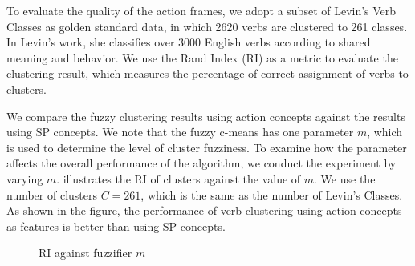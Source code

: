 
To evaluate the quality of the action frames,
we adopt a subset of Levin's Verb Classes as golden standard data,
in which 2620 verbs are clustered to 261 classes. In Levin's work\cite{1415692}, she classifies
over 3000 English verbs according to shared meaning and behavior.
We use the Rand Index (RI)\cite{1961008} as a metric to evaluate
the clustering result, which measures the percentage of correct
assignment of verbs to clusters.

We compare the fuzzy clustering results using action concepts against the results using
SP concepts.
We note that the fuzzy c-means has one parameter $m$, which is used to determine the level of cluster fuzziness.
To examine how the parameter affects the overall performance of the algorithm,
we conduct the experiment by varying $m$.
 illustrates the RI of clusters against the value of $m$.
We use the number of clusters $C=261$, which is the same as the number of
Levin's Classes.
As shown in the figure, the performance of verb clustering
using action concepts as features is better than using SP concepts.
\begin{figure}[th]
\centering
{}
\caption{RI against fuzzifier $m$}
\label{fig:cluster}
\end{figure}
